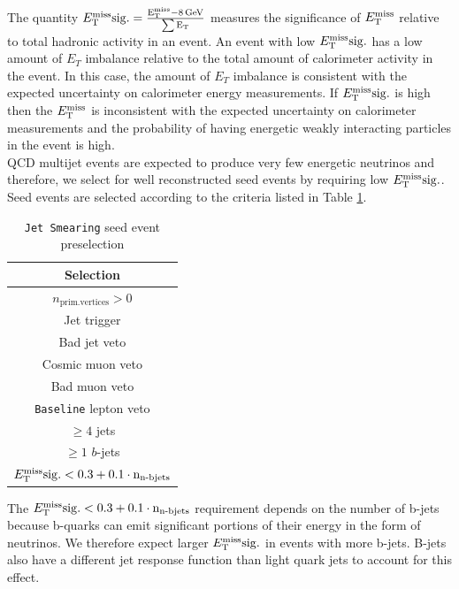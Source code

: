 \indent The quantity $E_{\mathrm{T}}^{\mathrm{miss}}\rm{sig.}=\frac{ E_{\mathrm{T}}^{\mathrm{miss}}-8\rm{\,GeV} } {\sum E_\mathrm{T} }$ measures the significance of $E_{\mathrm{T}}^{\mathrm{miss}}$ relative to total hadronic activity in an event.  An event with low $E_{\mathrm{T}}^{\mathrm{miss}}\rm{sig.}$ has a low amount of $E_T$ imbalance relative to the total amount of calorimeter activity in the event.  In this case, the amount of $E_T$ imbalance is consistent with the expected uncertainty on calorimeter energy measurements.  If $E_{\mathrm{T}}^{\mathrm{miss}}\rm{sig.}$ is high then the $E_{\mathrm{T}}^{\mathrm{miss}}$ is inconsistent with the expected uncertainty on calorimeter measurements and the probability of having energetic weakly interacting particles in the event is high.   \\

\indent QCD multijet events are expected to produce very few energetic neutrinos and therefore, we select for well reconstructed seed events by requiring low $E_{\mathrm{T}}^{\mathrm{miss}}\rm{sig.}$. Seed events are selected according to the criteria listed in Table \ref{tb:seed_events_presel}. \\

 \begin{table}[h!]
 \begin{center}
 \begin{tabular}{c} \hline
   Selection \\ \hline
   $n_\mathrm{prim. vertices} > 0$\\
   Jet trigger\\
   Bad jet veto\\
   Cosmic muon veto\\
   Bad muon veto\\
   {\tt Baseline} lepton veto\\
   $\geq 4$ jets\\
   $\geq 1$ $b$-jets\\
   $E_{\mathrm{T}}^{\mathrm{miss}}\rm{sig.} < 0.3 + 0.1\cdot n_{\textup{n-bjets}}$ \\ \hline
 \end{tabular}
 \end{center}
 \caption{{\tt Jet Smearing} seed event preselection}
 \label{tb:seed_events_presel}
 \end{table}

\indent The $E_{\mathrm{T}}^{\mathrm{miss}}\rm{sig.} < 0.3 + 0.1\cdot n_{\textup{n-bjets}}$ requirement depends on the number of b-jets because b-quarks can emit significant portions of their energy in the form of neutrinos.  We therefore expect larger $E_{\mathrm{T}}^{\mathrm{miss}}\rm{sig.}$ in events with more b-jets.  B-jets also have a different jet response function than light quark jets to account for this effect. \\

